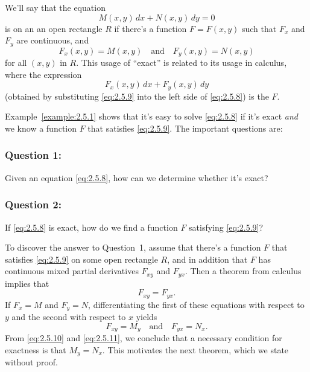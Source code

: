 \documentclass{ximera}
\begin{document}
 
We'll say that  the equation
\begin{equation} \label{eq:2.5.8}
M(x,y)\,dx+N(x,y)\,dy=0
\end{equation}
 is   on an an open rectangle  $R$ if there's
a function $F=F(x,y)$ such  that $F_x$
and $F_y$  are continuous, and
\begin{equation} \label{eq:2.5.9}
F_x(x,y)=M(x,y) \quad \text{and}\quad F_y(x,y)=N(x,y)
\end{equation}
for  all  $(x,y)$ in $R$.
This usage of ``exact'' is related  to its usage in calculus,
where the expression
$$
F_x(x,y)\,dx+F_y(x,y)\,dy
$$
(obtained by substituting \eqref{eq:2.5.9} into the left side of
\eqref{eq:2.5.8}) is the   $F$.
 
Example~\ref{example:2.5.1} shows that it's easy to solve
\eqref{eq:2.5.8}
if it's exact \textit{and}  we know a function $F$ that satisfies
\eqref{eq:2.5.9}. The important questions are:
 
 \subsubsection*{Question 1:}  Given an equation
\eqref{eq:2.5.8}, how can we determine whether it's  exact?
 
 \subsubsection*{Question 2:} If \eqref{eq:2.5.8} is exact, how do we find
a function $F$ satisfying \eqref{eq:2.5.9}?
 
To discover the answer to Question~1,
 assume that  there's a function $F$  that satisfies \eqref{eq:2.5.9} on
some open rectangle $R$, and in addition that $F$ has continuous mixed
partial derivatives $F_{xy}$ and $F_{yx}$.  Then a theorem from calculus
implies that
\begin{equation} \label{eq:2.5.10}
F_{xy}=F_{yx}.
\end{equation}
If $F_x=M$ and $F_y=N$,
differentiating the first of these equations with respect to
$y$ and the second with respect to $x$ yields
\begin{equation} \label{eq:2.5.11}
F_{xy}=M_y\quad\mbox{and}\quad  F_{yx}=N_x.
\end{equation}
From  \eqref{eq:2.5.10}  and \eqref{eq:2.5.11}, we conclude that
 a necessary condition for exactness is that $M_y=N_x$.
This motivates the next theorem, which we state without proof.
 
\end{document}
